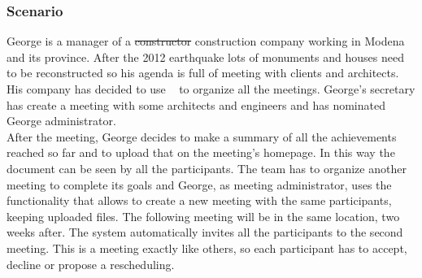 \subsubsection{Scenario \thecountScenarios }
George is a manager of a \st{constructor} construction company working in Modena and its province. After the 2012 earthquake lots of monuments and houses need to be reconstructed so his agenda is full of meeting with clients and architects. His company has decided to use \projectname~ to organize all the meetings. George's secretary has create a meeting with some architects and engineers and has nominated George administrator. \\
After the meeting, George decides to make a summary of all the achievements reached so far and to upload that on the meeting's homepage. In this way the document can be seen by all the participants. The team has to organize another meeting to complete its goals and George, as meeting administrator, uses the \projectname~ functionality that allows to create a new meeting with the same participants, keeping uploaded files. The following meeting will be in the same location, two weeks after. The system automatically invites all the participants to the second meeting. This is a meeting exactly like others, so each participant has to accept, decline or propose a rescheduling.\\

